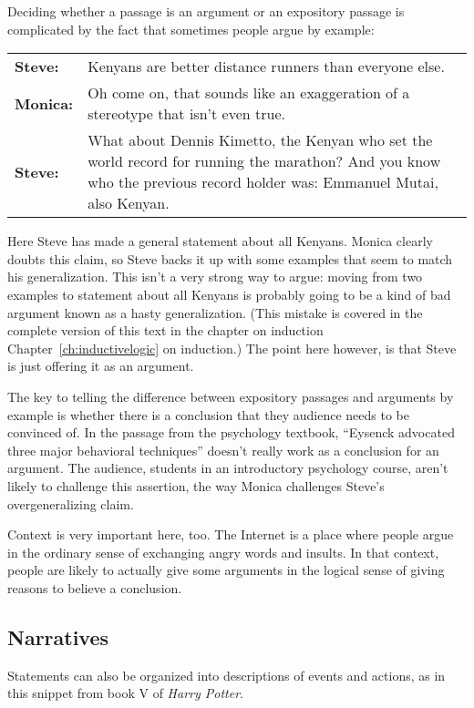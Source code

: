 Deciding whether a passage is an argument or an expository passage is complicated by the fact that sometimes people argue by example:

\begin{longtabu} to \textwidth {X[3,p]X[8,p]}
\textbf{Steve:} & Kenyans are better distance runners than everyone else. \\
\textbf{Monica:} & Oh come on, that sounds like an exaggeration of a stereotype that isn't even true.\\
\textbf{Steve:} & What about Dennis Kimetto, the Kenyan who set the world record for running the marathon? And you know who the previous record holder was: Emmanuel Mutai, also Kenyan. \\
\end{longtabu}

Here Steve has made a general statement about all Kenyans. Monica clearly doubts this claim, so Steve backs it up with some examples that seem to match his generalization. This isn't a very strong way to argue: moving from two examples to statement about all Kenyans is probably going to be a kind of bad argument known as a hasty generalization. (This mistake is covered in the complete version of this text in the chapter on induction Chapter~\ref{ch:inductivelogic} on induction.) The point here however, is that Steve is just offering it as an argument.

The key to telling the difference between expository passages and arguments by example is whether there is a conclusion that they audience needs to be convinced of. In the passage from the psychology textbook, ``Eysenck advocated three major behavioral techniques'' doesn't really work as a conclusion for an argument. The audience, students in an introductory psychology course, aren't likely to challenge this assertion, the way Monica  challenges Steve's overgeneralizing claim.

Context is very important here, too. The Internet is a place where people argue in the ordinary sense of exchanging angry words and insults. In that context, people are likely to actually give some arguments in the logical sense of giving reasons to believe a conclusion.

\subsection{Narratives}

Statements can also be organized into descriptions of events and actions, as in this snippet from book V of \textit{Harry Potter}.

